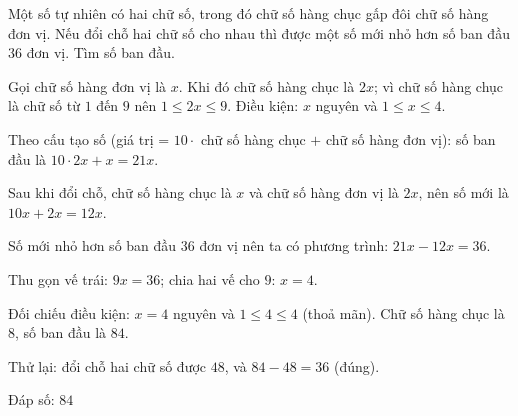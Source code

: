 \begin{problem}[8DS-PT1-015]
Một số tự nhiên có hai chữ số, trong đó chữ số hàng chục gấp đôi chữ số hàng đơn vị. Nếu đổi chỗ hai chữ số cho nhau thì được một số mới nhỏ hơn số ban đầu $36$ đơn vị. Tìm số ban đầu.

\begin{solution}
Gọi chữ số hàng đơn vị là $x$. Khi đó chữ số hàng chục là $2x$; vì chữ số hàng chục là chữ số từ $1$ đến $9$ nên $1 \leq 2x \leq 9$. Điều kiện: $x$ nguyên và $1 \leq x \leq 4$.

Theo cấu tạo số (giá trị = $10 \cdot$ chữ số hàng chục $+$ chữ số hàng đơn vị): số ban đầu là $10 \cdot 2x + x = 21x$.

Sau khi đổi chỗ, chữ số hàng chục là $x$ và chữ số hàng đơn vị là $2x$, nên số mới là $10x + 2x = 12x$.

Số mới nhỏ hơn số ban đầu $36$ đơn vị nên ta có phương trình: $21x - 12x = 36$.

Thu gọn vế trái: $9x = 36$; chia hai vế cho $9$: $x = 4$.

Đối chiếu điều kiện: $x = 4$ nguyên và $1 \leq 4 \leq 4$ (thoả mãn). Chữ số hàng chục là $8$, số ban đầu là $84$.

Thử lại: đổi chỗ hai chữ số được $48$, và $84 - 48 = 36$ (đúng).

Đáp số: $\boxed{84}$
\end{solution}
\end{problem}

